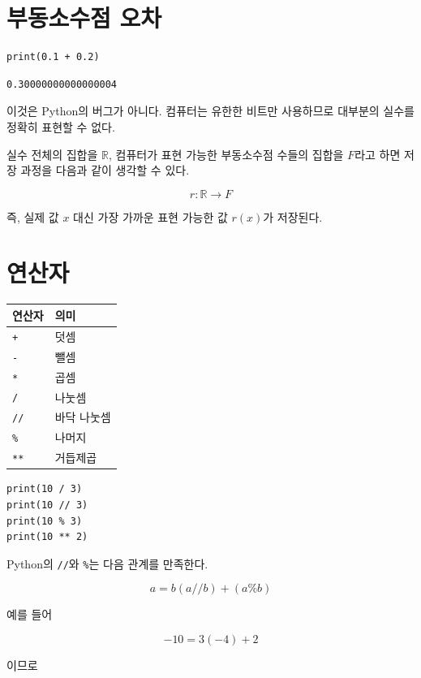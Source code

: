 \documentclass[11pt,a4paper]{article}
\begin{document}
\section{부동소수점 오차}

\begin{lstlisting}
print(0.1 + 0.2)
\end{lstlisting}

\begin{verbatim}
0.30000000000000004
\end{verbatim}

이것은 Python의 버그가 아니다. 컴퓨터는 유한한 비트만 사용하므로 대부분의 실수를 정확히 표현할 수 없다.

실수 전체의 집합을 \(\mathbb{R}\), 컴퓨터가 표현 가능한 부동소수점 수들의 집합을 \(F\)라고 하면 저장 과정을 다음과 같이 생각할 수 있다.

\[
r:\mathbb{R}\rightarrow F
\]

즉, 실제 값 \(x\) 대신 가장 가까운 표현 가능한 값 \(r(x)\)가 저장된다.

\section{연산자}

\begin{center}
\begin{tabular}{ll}
\toprule
연산자 & 의미 \\
\midrule
\texttt{+} & 덧셈 \\
\texttt{-} & 뺄셈 \\
\texttt{*} & 곱셈 \\
\texttt{/} & 나눗셈 \\
\texttt{//} & 바닥 나눗셈 \\
\texttt{\%} & 나머지 \\
\texttt{**} & 거듭제곱 \\
\bottomrule
\end{tabular}
\end{center}

\begin{lstlisting}
print(10 / 3)
print(10 // 3)
print(10 % 3)
print(10 ** 2)
\end{lstlisting}

Python의 \texttt{//}와 \texttt{\%}는 다음 관계를 만족한다.

\[
a=b(a//b)+(a\%b)
\]

예를 들어

\[
-10=3(-4)+2
\]

이므로
\end{document}
